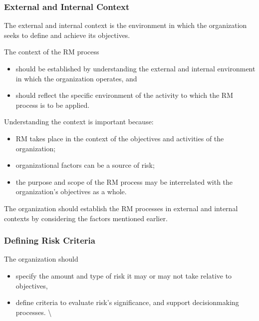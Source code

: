 \documentclass[letterpaper,10pt,english]{jupyterBook}
\begin{document}
\subsubsection{External and Internal Context}
\label{\detokenize{PM/rm:external-and-internal-context}}
\sphinxAtStartPar
The external and internal context is the environment in which the organization seeks to define and achieve its objectives.

\sphinxAtStartPar
The context of the RM process
\begin{itemize}
\item {} 
\sphinxAtStartPar
should be established by understanding the external and internal environment in which the organization operates, and

\item {} 
\sphinxAtStartPar
should reflect the specific environment of the activity to which the RM process is to be applied.

\end{itemize}

\sphinxAtStartPar
Understanding the context is important because:
\begin{itemize}
\item {} 
\sphinxAtStartPar
RM takes place in the context of the objectives and activities of the organization;

\item {} 
\sphinxAtStartPar
organizational factors can be a source of risk;

\item {} 
\sphinxAtStartPar
the purpose and scope of the RM process may be interrelated with the organization’s objectives as a whole.

\end{itemize}

\sphinxAtStartPar
The organization should establish the RM processes in external and internal contexts by considering the factors mentioned earlier.


\subsubsection{Defining Risk Criteria}
\label{\detokenize{PM/rm:defining-risk-criteria}}
\sphinxAtStartPar
The organization should
\begin{itemize}
\item {} 
\sphinxAtStartPar
specify the amount and type of risk it may or may not take relative to objectives,

\item {} 
\sphinxAtStartPar
define criteria to evaluate risk’s significance, and support decision\sphinxhyphen{}making processes. \textbackslash{}

\end{itemize}
\end{document}

